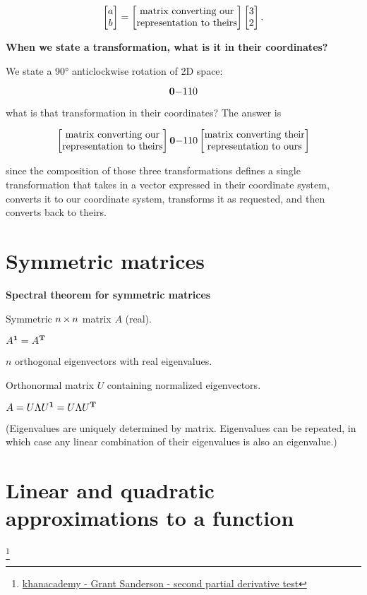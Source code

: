 $$
\begin{bmatrix}a\\b\end{bmatrix} =
\begin{bmatrix}\text{matrix converting our}\\\text{representation to theirs} \\ \end{bmatrix}
\begin{bmatrix}3\\2\end{bmatrix}.
$$

\textbf{When we state a transformation, what is it in their coordinates?}

We state a 90° anticlockwise rotation of 2D space:

$$
\mathbf{0}{-1}
    {1}{0}
$$

what is that transformation in their coordinates? The answer is

$$
\begin{bmatrix}\text{matrix converting our}\\\text{representation to theirs} \\ \end{bmatrix}
\mathbf{0}{-1}
    {1}{0}
\begin{bmatrix}\text{matrix converting their}\\\text{representation to ours} \\ \end{bmatrix}
$$

since the composition of those three transformations defines a single
transformation that takes in a vector expressed in their coordinate system,
converts it to our coordinate system, transforms it as requested, and then
converts back to theirs.


\section{Symmetric matrices}

\textbf{Spectral theorem for symmetric matrices}

Symmetric $n \operatorname{\times} n$ matrix $A$ (real).

$A^{\mathbf 1} = A^{\mathbf{T}}$

$n$ orthogonal eigenvectors with real eigenvalues.

Orthonormal matrix $U$ containing normalized eigenvectors.

$A = U\Lambda U^{\mathbf 1} = U\Lambda U^{\mathbf{T}}$

(Eigenvalues are uniquely determined by matrix. Eigenvalues can be repeated, in which case any linear combination of their
eigenvalues is also an eigenvalue.)



\section{Linear and quadratic approximations to a function}
\footnote{
  \href{https://www.khanacademy.org/math/multivariable-calculus/applications-of-multivariable-derivatives/optimizing-multivariable-functions/a/reasoning-behind-the-second-partial-derivative-test}{khanacademy - Grant Sanderson - second partial derivative test}
}





